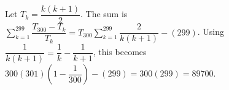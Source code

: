 Let $T_k=\dfrac{k(k+1)}{2}$. The sum is $\sum_{k=1}^{299}\dfrac{T_{300}-T_k}{T_k}=T_{300}\sum_{k=1}^{299}\dfrac{2}{k(k+1)}-(299)$. Using $\dfrac{1}{k(k+1)}=\dfrac{1}{k}-\dfrac{1}{k+1}$, this becomes $300(301)(1-\dfrac{1}{300})-(299)=300(299)=\boxed{89700}$.
